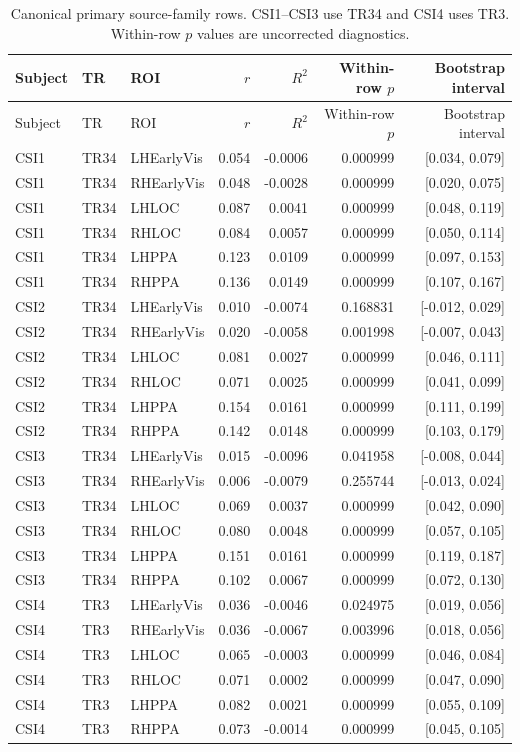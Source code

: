 \documentclass[11pt]{article}
\newcommand{\rsq}{$R^2$}
\begin{document}
\footnotesize
\begin{longtable}{lllrrrr}
\caption{Canonical primary source-family rows. CSI1--CSI3 use TR34 and CSI4 uses TR3. Within-row $p$ values are uncorrected diagnostics.}\label{tab:primary-rows}\\
\toprule
Subject & TR & ROI & $r$ & \rsq{} & Within-row $p$ & Bootstrap interval \\
\midrule
\endfirsthead
\toprule
Subject & TR & ROI & $r$ & \rsq{} & Within-row $p$ & Bootstrap interval \\
\midrule
\endhead
CSI1 & TR34 & LHEarlyVis & 0.054 & -0.0006 & 0.000999 & [0.034, 0.079] \\
CSI1 & TR34 & RHEarlyVis & 0.048 & -0.0028 & 0.000999 & [0.020, 0.075] \\
CSI1 & TR34 & LHLOC & 0.087 & 0.0041 & 0.000999 & [0.048, 0.119] \\
CSI1 & TR34 & RHLOC & 0.084 & 0.0057 & 0.000999 & [0.050, 0.114] \\
CSI1 & TR34 & LHPPA & 0.123 & 0.0109 & 0.000999 & [0.097, 0.153] \\
CSI1 & TR34 & RHPPA & 0.136 & 0.0149 & 0.000999 & [0.107, 0.167] \\
CSI2 & TR34 & LHEarlyVis & 0.010 & -0.0074 & 0.168831 & [-0.012, 0.029] \\
CSI2 & TR34 & RHEarlyVis & 0.020 & -0.0058 & 0.001998 & [-0.007, 0.043] \\
CSI2 & TR34 & LHLOC & 0.081 & 0.0027 & 0.000999 & [0.046, 0.111] \\
CSI2 & TR34 & RHLOC & 0.071 & 0.0025 & 0.000999 & [0.041, 0.099] \\
CSI2 & TR34 & LHPPA & 0.154 & 0.0161 & 0.000999 & [0.111, 0.199] \\
CSI2 & TR34 & RHPPA & 0.142 & 0.0148 & 0.000999 & [0.103, 0.179] \\
CSI3 & TR34 & LHEarlyVis & 0.015 & -0.0096 & 0.041958 & [-0.008, 0.044] \\
CSI3 & TR34 & RHEarlyVis & 0.006 & -0.0079 & 0.255744 & [-0.013, 0.024] \\
CSI3 & TR34 & LHLOC & 0.069 & 0.0037 & 0.000999 & [0.042, 0.090] \\
CSI3 & TR34 & RHLOC & 0.080 & 0.0048 & 0.000999 & [0.057, 0.105] \\
CSI3 & TR34 & LHPPA & 0.151 & 0.0161 & 0.000999 & [0.119, 0.187] \\
CSI3 & TR34 & RHPPA & 0.102 & 0.0067 & 0.000999 & [0.072, 0.130] \\
CSI4 & TR3 & LHEarlyVis & 0.036 & -0.0046 & 0.024975 & [0.019, 0.056] \\
CSI4 & TR3 & RHEarlyVis & 0.036 & -0.0067 & 0.003996 & [0.018, 0.056] \\
CSI4 & TR3 & LHLOC & 0.065 & -0.0003 & 0.000999 & [0.046, 0.084] \\
CSI4 & TR3 & RHLOC & 0.071 & 0.0002 & 0.000999 & [0.047, 0.090] \\
CSI4 & TR3 & LHPPA & 0.082 & 0.0021 & 0.000999 & [0.055, 0.109] \\
CSI4 & TR3 & RHPPA & 0.073 & -0.0014 & 0.000999 & [0.045, 0.105] \\
\bottomrule
\end{longtable}
\normalsize
\end{document}
